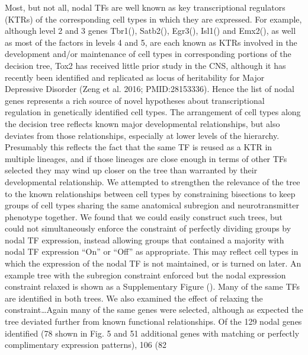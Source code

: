 Most, but not all, nodal TFs are well known as key transcriptional regulators (KTRs) of the corresponding cell types in which they are expressed. For example, although level 2 and 3 genes Tbr1(), Satb2(), Egr3(), Isl1() and Emx2(), as well as most of the factors in levels 4 and 5, are each known as KTRs involved in the development and/or maintenance of cell types in corresponding portions of the decision tree, Tox2 has received little prior study in the CNS, although it has recently been identified and replicated as locus of heritability for Major Depressive Disorder (Zeng et al. 2016; PMID:28153336). Hence the list of nodal genes represents a rich source of novel hypotheses about transcriptional regulation in genetically identified cell types. 
The arrangement of cell types along the decision tree reflects known major developmental relationships, but also deviates from those relationships, especially at lower levels of the hierarchy. Presumably this reflects the fact that the same TF is reused as a KTR in multiple lineages, and if those lineages are close enough in terms of other TFs selected they may wind up closer on the tree than warranted by their developmental relationship. We attempted to strengthen the relevance of the tree to the known relationships between cell types by constraining bisections to keep groups of cell types sharing the same anatomical subregion and neurotransmitter phenotype together. We found that we could easily construct such trees, but could not simultaneously enforce the constraint of perfectly dividing groups by nodal TF expression, instead allowing groups that contained a majority with nodal TF expression “On” or “Off” as appropriate. This may reflect cell types in which the expression of the nodal TF is not maintained, or is turned on later. An example tree with the subregion constraint enforced but the nodal expression constraint relaxed is shown as a Supplementary Figure (). Many of the same TFs are identified in both trees. We also examined the effect of relaxing the constraint…Again many of the same genes were selected, although as expected the tree deviated further from known functional relationships. Of the 129 nodal genes identified (78 shown in Fig. 5 and 51 additional genes with matching or perfectly complimentary expression patterns), 106 (82%
